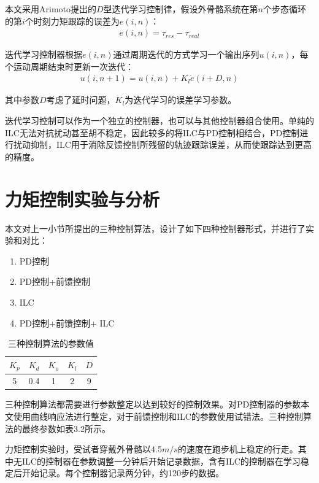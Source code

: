 本文采用Arimoto\cite{p47}提出的$D$型迭代学习控制律，假设外骨骼系统在第$n$个步态循环的第$i$个时刻力矩跟踪的误差为$e(i,n)$：
\begin{align}
    e(i,n) = \tau_{res} - \tau_{real}
\end{align}

迭代学习控制器根据$e(i,n)$通过周期迭代的方式学习一个输出序列$u(i,n)$，每个运动周期结束时更新一次迭代：
\begin{align}
    u(i,n+1) = u(i,n) + K_l\dot{e}(i+D,n)
\end{align}

其中参数$D$考虑了延时问题，$K_l$为迭代学习的误差学习参数。

迭代学习控制可以作为一个独立的控制器，也可以与其他控制器组合使用。单纯的ILC无法对抗扰动甚至胡不稳定，因此较多的将ILC与PD控制相结合，PD控制进行扰动抑制，ILC用于消除反馈控制所残留的轨迹跟踪误差，从而使跟踪达到更高的精度。

\section{力矩控制实验与分析}

本文对上一小节所提出的三种控制算法，设计了如下四种控制器形式，并进行了实验和对比：
\begin{enumerate}
    \item PD控制
    \item PD控制+前馈控制
    \item ILC
    \item PD控制+前馈控制+ ILC
\end{enumerate}

\begin{table}[htb]
    \caption[控制参数]{三种控制算法的参数值}
    \begin{tabular}{ccccc}
      \toprule
        $K_p$ & $K_d$ & $K_o$ & $K_l$ & $D$ \\
      \midrule
        5 & 0.4 & 1 & 2 & 9 \\
      \bottomrule
    \end{tabular}
\end{table}


三种控制算法都需要进行参数整定以达到较好的控制效果。对PD控制器的参数本文使用曲线响应法进行整定，对于前馈控制和ILC的参数使用试错法。三种控制算法的最终参数如表3.2所示。

力矩控制实验时，受试者穿戴外骨骼以4.5$m/s$的速度在跑步机上稳定的行走。其中无ILC的控制器在参数调整一分钟后开始记录数据，含有ILC的控制器在学习稳定后开始记录。每个控制器记录两分钟，约120步的数据。

